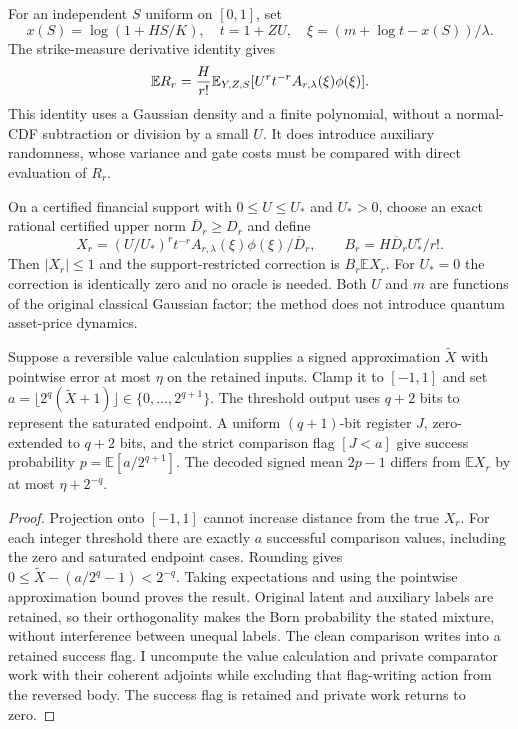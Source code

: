 For an independent $S$ uniform on $[0,1]$, set
\[
 x(S)=\log(1+HS/K),\quad t=1+ZU,\quad
 \xi=(m+\log t-x(S))/\lambda.
\]
The strike-measure derivative identity gives
\begin{equation}
 \mathbb E R_r={H\over r!}\mathbb E_{Y,Z,S}
       [U^r t^{-r}A_{r,\lambda}(\xi)\phi(\xi)].
 \label{eq:quantum-density-remainder}
\end{equation}
This identity uses a Gaussian density and a finite polynomial, without
a normal-CDF subtraction or division by a small $U$. It does introduce
auxiliary randomness, whose variance and gate costs must be compared
with direct evaluation of $R_r$.

On a certified financial support with $0\leq U\leq U_*$ and $U_*>0$,
choose an exact rational certified upper norm $\overline D_r\geq D_r$ and
define
\begin{equation}
 X_r=(U/U_*)^r t^{-r}A_{r,\lambda}(\xi)\phi(\xi)/\overline D_r,
 \qquad B_r=H\overline D_r U_*^r/r!.
 \label{eq:quantum-remainder-signal}
\end{equation}
Then $|X_r|\leq1$ and the support-restricted correction is $B_r\mathbb E X_r$.
For $U_*=0$ the correction is identically zero and no oracle is needed.
Both $U$ and $m$ are functions of the original classical Gaussian factor;
the method does not introduce quantum asset-price dynamics.

\begin{proposition}
\label{prop:integral-signed-comparator}
Suppose a reversible value calculation supplies a signed approximation
$\widetilde X$ with pointwise error at most $\eta$ on the retained inputs.
Clamp it to $[-1,1]$ and set
$a=\lfloor 2^q(\widetilde X+1)\rfloor\in\{0,\ldots,2^{q+1}\}$.
The threshold output uses $q+2$ bits to represent the saturated endpoint.
A uniform $(q+1)$-bit register $J$, zero-extended to $q+2$ bits, and the strict comparison flag
$[J<a]$ give success probability $p=\mathbb E[a/2^{q+1}]$.
The decoded signed mean $2p-1$ differs from $\mathbb E X_r$ by at most
$\eta+2^{-q}$.
\end{proposition}
\begin{proof}
Projection onto $[-1,1]$ cannot increase distance from the true $X_r$.
For each integer threshold there are exactly $a$ successful comparison
values, including the zero and saturated endpoint cases. Rounding gives
$0\leq\widetilde X-(a/2^q-1)<2^{-q}$. Taking expectations and using the
pointwise approximation bound proves the result. Original latent and
auxiliary labels are retained, so their orthogonality makes the Born
probability the stated mixture, without interference between unequal labels.
The clean comparison writes into a retained success flag. I uncompute
the value calculation and private comparator work with their coherent
adjoints while excluding that flag-writing action from the reversed body.
The success flag is retained and private work returns to zero.
\end{proof}

